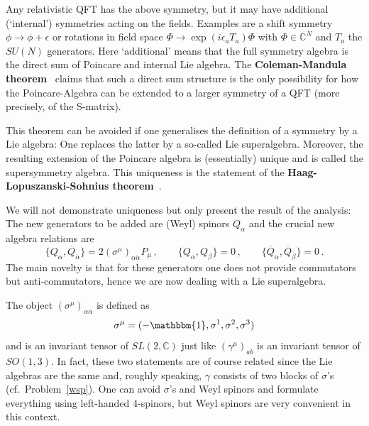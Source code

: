 \documentclass[12pt]{article}
\newcommand{\be}{\begin{equation}}
\newcommand{\ee}{\end{equation}}
\newcommand{\ol}{\overline}
\numberwithin{equation}{section}
\begin{document}
Any relativistic QFT has the above symmetry, but it may have additional (`internal') symmetries acting on the fields. Examples are a shift symmetry $\phi\to \phi+\epsilon$ or rotations in field space $\Phi\to \exp(i\epsilon_a T_a)\Phi$ with $\Phi\in \mathbb{C}^N$ and $T_a$ the $SU(N)$ generators. Here `additional' means that the full symmetry algebra is the direct sum of Poincare and internal Lie algebra. The {\bf Coleman-Mandula theorem}~\cite{Coleman:1967ad} claims that such a direct sum structure is the only possibility for how the Poincare-Algebra can be extended to a larger symmetry of a QFT (more precisely, of the S-matrix).

This theorem can be avoided if one generalises the definition of a symmetry by a Lie algebra: One replaces the latter by a so-called Lie superalgebra. Moreover, the resulting extension of the Poincare algebra is (essentially) unique and is called the supersymmetry algebra. This uniqueness is the statement of the {\bf Haag-Lopuszanski-Sohnius theorem}~\cite{Haag:1974qh}.

We will not demonstrate uniqueness but only present the result of the analysis: The new generators to be added are (Weyl) spinors $Q_\alpha$ and the crucial new algebra relations are
\be
\{Q_\alpha,\ol{Q}_{\dot{\alpha}}\}=2(\sigma^\mu)_{\alpha\dot{\alpha}}P_\mu\,, \qquad \{Q_\alpha,Q_\beta\}=0\,,\qquad \{\ol{Q}_{\dot{\alpha}} ,\ol{Q}_{\dot{\beta}}\}=0\,.\label{qc}
\ee
The main novelty is that for these generators one does not provide commutators but anti-commutators, hence we are now dealing with a Lie superalgebra.

The object $(\sigma^\mu)_{\alpha\dot{\alpha}}$ is defined as
\be
\sigma^\mu=(-\mathbbm{1},\sigma^1,\sigma^2,\sigma^3)
\ee
and is an invariant tensor of $SL(2,\mathbb{C})$ just like $(\gamma^\mu)_{ab}$ is an invariant tensor of $SO(1,3)$. In fact, these two statements are of course related since the Lie algebras are the same and, roughly speaking, $\gamma$ consists of two blocks of $\sigma$'s (cf.~Problem~\ref{wsp}). One can avoid $\sigma$'s and Weyl spinors and formulate everything using left-handed 4-spinors, but Weyl spinors are very convenient in this context. 
\end{document}
